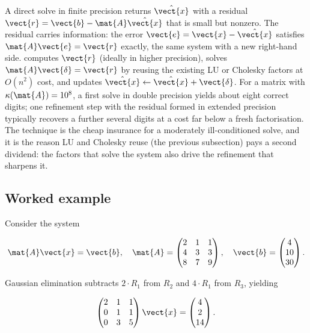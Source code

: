 \begin{example}
A direct solve in finite precision returns $\hat{\vect{x}}$ with a
residual $\vect{r} = \vect{b} - \mat{A}\hat{\vect{x}}$ that is small
but nonzero. The residual carries information: the error $\vect{e} =
\vect{x} - \hat{\vect{x}}$ satisfies $\mat{A}\vect{e} = \vect{r}$
exactly, the same system with a new right-hand side.  computes $\vect{r}$ (ideally in higher precision), solves
$\mat{A}\vect{\delta} = \vect{r}$ by reusing the existing LU or
Cholesky factors at $O(n^{2})$ cost, and updates $\hat{\vect{x}}
\leftarrow \hat{\vect{x}} + \vect{\delta}$. For a matrix with
$\kappa(\mat{A}) = 10^{8}$, a first solve in double precision yields
about eight correct digits; one refinement step with the residual
formed in extended precision typically recovers a further several
digits at a cost far below a fresh factorisation. The technique is
the cheap insurance for a moderately ill-conditioned solve, and it is
the reason LU and Cholesky reuse (the previous subsection) pays a
second dividend: the factors that solve the system also drive the
refinement that sharpens it.
\end{example}

\subsection{Worked example}

Consider the system

\[
\mat{A}\vect{x} = \vect{b}, \quad
\mat{A} = \begin{pmatrix} 2 & 1 & 1 \\ 4 & 3 & 3 \\ 8 & 7 & 9
\end{pmatrix}, \quad
\vect{b} = \begin{pmatrix} 4 \\ 10 \\ 30 \end{pmatrix}.
\]

Gaussian elimination subtracts $2 \cdot R_{1}$ from $R_{2}$ and
$4 \cdot R_{1}$ from $R_{3}$, yielding

\[
\begin{pmatrix} 2 & 1 & 1 \\ 0 & 1 & 1 \\ 0 & 3 & 5 \end{pmatrix}
\vect{x} = \begin{pmatrix} 4 \\ 2 \\ 14 \end{pmatrix}.
\]


